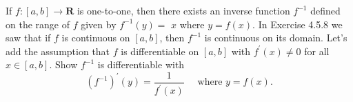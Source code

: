 \begin{exercise}
  If $f:[a, b] \rightarrow \mathbf{R}$ is one-to-one, then there exists an inverse function $f^{-1}$ defined on the range of $f$ given by $f^{-1}(y)=$ $x$ where $y=f(x)$. In Exercise 4.5.8 we saw that if $f$ is continuous on $[a, b]$, then $f^{-1}$ is continuous on its domain. Let's add the assumption that $f$ is differentiable on $[a, b]$ with $f^{\prime}(x) \neq 0$ for all $x \in[a, b]$. Show $f^{-1}$ is differentiable with
  $$
  \left(f^{-1}\right)^{\prime}(y)=\frac{1}{f^{\prime}(x)} \quad \text { where } y=f(x) .
  $$
\end{exercise}
\begin{solution}
  \TODO
\end{solution}
